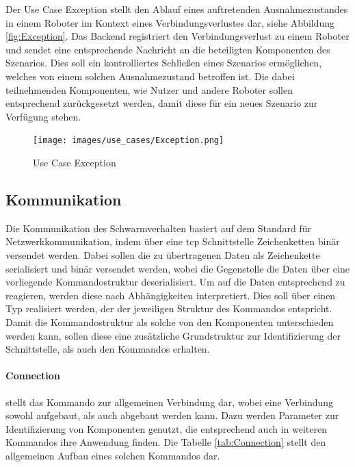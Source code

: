 Der Use Case Exception stellt den Ablauf eines auftretenden Ausnahmezustandes in einem Roboter im Kontext eines Verbindungsverlustes dar, siehe Abbildung \eqref{fig:Exception}. Das Backend registriert den Verbindungsverlust zu einem Roboter und sendet eine entsprechende Nachricht an die beteiligten Komponenten des Szenarios. Dies soll ein kontrolliertes Schließen eines Szenarios ermöglichen, welches von einem solchen Ausnahmezustand betroffen ist. Die dabei teilnehmenden Komponenten, wie Nutzer und andere Roboter sollen entsprechend zurückgesetzt werden, damit diese für ein neues Szenario zur Verfügung stehen.\\

\begin{figure}[h]
	\begin{center}
		\texttt{[image: images/use\_cases/Exception.png]}
	\end{center}
	\caption{Use Case Exception}
	\label{fig:Exception}
\end{figure}

\newpage
\subsection{Kommunikation}\label{kommunikation}

Die Kommunikation des Schwarmverhalten basiert auf dem Standard für Netzwerkkommunikation, indem über eine \gls{tcp} Schnittstelle Zeichenketten binär versendet werden. Dabei sollen die zu übertragenen Daten als Zeichenkette serialisiert und binär versendet werden, wobei die Gegenstelle die Daten über eine vorliegende Kommandostruktur deserialisiert. Um auf die Daten entsprechend zu reagieren, werden diese nach Abhängigkeiten interpretiert. Dies soll über einen Typ realisiert werden, der der jeweiligen Struktur des Kommandos entspricht. Damit die Kommandostruktur als solche von den Komponenten unterschieden werden kann, sollen diese eine zusätzliche Grundstruktur zur Identifizierung der Schnittstelle, als auch den Kommandos erhalten. 

\paragraph{Connection} stellt das Kommando zur allgemeinen Verbindung dar, wobei eine Verbindung sowohl aufgebaut, als auch abgebaut werden kann. Dazu werden Parameter zur Identifizierung von Komponenten genutzt, die entsprechend auch in weiteren Kommandos ihre Anwendung finden. Die Tabelle \eqref{tab:Connection} stellt den allgemeinen Aufbau eines solchen Kommandos dar.

